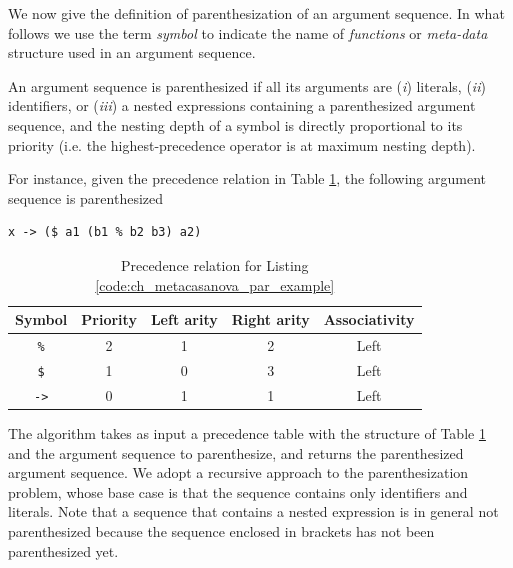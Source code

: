 We now give the definition of parenthesization of an argument sequence. In what follows we use the term \textit{symbol} to indicate the name of \textit{functions} or \textit{meta-data} structure used in an argument sequence.

\begin{definition}
	\label{def:ch_metacasanova_parenthesization}
	An argument sequence is parenthesized if all its arguments are (\textit{i}) literals, (\textit{ii}) identifiers, or (\textit{iii}) a nested expressions containing a parenthesized argument sequence, and the nesting depth of a symbol is directly proportional to its priority (i.e. the highest-precedence operator is at maximum nesting depth).
\end{definition}

\noindent
For instance, given the precedence relation in Table \ref{tab:ch_metacasanova_example_precedence_relation}, the following argument sequence is parenthesized

\begin{lstlisting}[label = code:ch_metacasanova_par_example,caption = Example of parenthesization]
x -> ($ a1 (b1 % b2 b3) a2)
\end{lstlisting}

\begin{table}
	\begin{tabular}{|c|c|c|c|c|}
		\hline
		\textbf{Symbol} & \textbf{Priority} & \textbf{Left arity} & \textbf{Right arity} & \textbf{Associativity} \\
		\hline
		\texttt{\%} & 2 & 1 & 2 & Left \\
		\hline
		\texttt{\$} & 1 & 0 & 3 & Left \\
		\hline
		\texttt{->} & 0 & 1 & 1 & Left \\
		\hline
	\end{tabular}
	\caption{Precedence relation for Listing \ref{code:ch_metacasanova_par_example}}
	\label{tab:ch_metacasanova_example_precedence_relation}
\end{table}

The algorithm takes as input a precedence table with the structure of Table \ref{tab:ch_metacasanova_example_precedence_relation} and the argument sequence to parenthesize, and returns the parenthesized argument sequence. We adopt a recursive approach to the parenthesization problem, whose base case is that the sequence contains only identifiers and literals. Note that a sequence that contains a nested expression is in general not parenthesized because the sequence enclosed in brackets has not been parenthesized yet.


